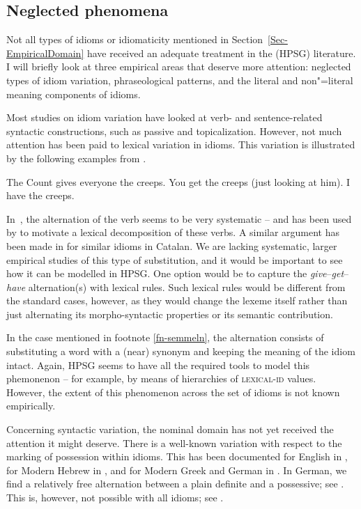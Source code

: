 \documentclass[output=paper
                ,modfonts
                ,nonflat
	        ,collection
	        ,collectionchapter
	        ,collectiontoclongg
 	        ,biblatex
                ,babelshorthands
                ,newtxmath
                ,draftmode
                ,colorlinks, citecolor=brown
]{./langsci/langscibook}
\begin{document}
\subsection{Neglected phenomena}
\label{Sec-Neglected}

Not all types of idioms or idiomaticity mentioned in Section~\ref{Sec-EmpiricalDomain} have received an adequate treatment in the (HPSG) literature.
I will briefly look at three empirical areas that deserve more attention: neglected types of idiom variation, phraseological patterns, and the literal and non"=literal meaning components of idioms.

Most studies on idiom variation have looked at verb- and sentence-related syntactic constructions, such as passive and topicalization. 
However, not much attention has been paid to lexical variation in idioms. This variation is illustrated by the following examples from \citet[, 191]{Richards:01}. 

\eal  \label{creeps}
\ex The Count gives everyone the creeps.
\ex You get the creeps (just looking at him).
\ex I have the creeps.
\zl 

In~, the alternation of the verb seems to be very systematic -- and has been used by \citet{Richards:01} to motivate a lexical decomposition of these verbs.
A similar argument has been made in \citet{Mateu:Espinal:07} for similar idioms in Catalan. 
We are lacking systematic, larger empirical studies of this type of substitution, and it would be important to see how it can be modelled in HPSG. 
One option would be to capture the \emph{give}--\emph{get}--\emph{have} alternation(s) with lexical rules. Such lexical rules would be different from the standard cases, however, as they would change the lexeme itself rather than just alternating its morpho-syntactic properties or its semantic contribution.

In the case mentioned in footnote \ref{fn-semmeln}, the alternation consists of substituting a word with a (near) synonym and keeping the meaning of the idiom intact. Again, HPSG seems to have all the required tools to model this phemonenon -- for example, by means of hierarchies of \textsc{lexical-id} values. 
However, the extent of this phenomenon across the set of idioms is not known empirically. 

Concerning syntactic variation, the nominal domain has not yet received the attention it might deserve. 
There is a well-known variation with respect to the marking of possession within idioms. 
This has been documented for English in \citet{Ho:15}, for Modern Hebrew in \citet{Almog:12}, and for Modern Greek and German in \citet{Markantonatou:Sailer:16}. 
In German, we find a relatively free alternation between a plain definite and a possessive; see . This is, however, not possible with all idioms; see  .
\end{document}
